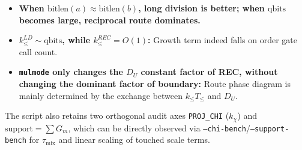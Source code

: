 \begin{remark}
\begin{itemize}
  \item \textbf{When \(\mathrm{bitlen}(a)\approx \mathrm{bitlen}(b)\), long division is better; when \(\mathrm{qbits}\) becomes large, reciprocal route dominates.}
  \item \textbf{\(k_{\le}^{LD}\sim \mathrm{qbits}\), while \(k_{\le}^{REC}=O(1)\):} Growth term indeed falls on order gate call count.
  \item \textbf{\texttt{mulmode} only changes the \(D_U\) constant factor of REC, without changing the dominant factor of boundary:} Route phase diagram is mainly determined by the exchange between \(k_{\le}T_{\le}\) and \(D_U\).
\end{itemize}
The script also retains two orthogonal audit axes \texttt{PROJ\_CHI} (\(k_\chi\)) and \(\mathrm{support}=\sum G_m\), which can be directly observed via \texttt{--chi-bench}/\texttt{--support-bench} for \(\tau_{\mathrm{mix}}\) and linear scaling of touched scale terms.
\end{remark}


